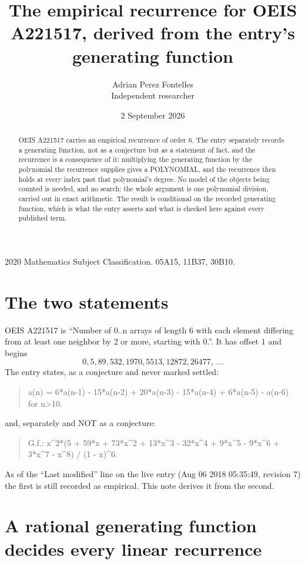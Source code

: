 \documentclass[11pt,a4paper]{article}
\title{The empirical recurrence for OEIS A221517, derived from the entry's generating function}
\author{Adrian Perez Fontelles\\ \small Independent researcher}
\date{2 September 2026}
\theoremstyle{plain}
\theoremstyle{definition}
\begin{document}
\maketitle

\begin{abstract}
OEIS A221517 carries an empirical recurrence of order $6$. The entry separately records a
generating function, not as a conjecture but as a statement of fact, and the recurrence is a
consequence of it: multiplying the generating function by the polynomial the recurrence
supplies gives a POLYNOMIAL, and the recurrence then holds at every index past that
polynomial's degree. No model of the objects being counted is needed, and no search: the
whole argument is one polynomial division, carried out in exact arithmetic. The result is
conditional on the recorded generating function, which is what the entry asserts and what is
checked here against every published term.
\end{abstract}

\noindent\small 2020 Mathematics Subject Classification. 05A15, 11B37, 30B10.\normalsize

\section{The two statements}

OEIS A221517 is ``Number of 0..n arrays of length 6 with each element differing from at least one neighbor by 2 or more, starting with 0.''. It has offset $1$ and begins
\[
0, 5, 89, 532, 1970, 5513, 12872, 26477,\ \dots
\]
The entry states, as a conjecture and never marked settled:
\begin{quote}
a(n) = 6*a(n-1) - 15*a(n-2) + 20*a(n-3) - 15*a(n-4) + 6*a(n-5) - a(n-6) for n>10.
\end{quote}
and, separately and NOT as a conjecture:
\begin{quote}
G.f.: x\^{}2*(5 + 59*x + 73*x\^{}2 + 13*x\^{}3 - 32*x\^{}4 + 9*x\^{}5 - 9*x\^{}6 + 3*x\^{}7 - x\^{}8) / (1 - x)\^{}6.
\end{quote}
As of the ``Last modified'' line on the live entry (Aug 06 2018 05:35:49, revision 7) the first is still
recorded as empirical. This note derives it from the second.

\section{A rational generating function decides every linear recurrence}
\end{document}
